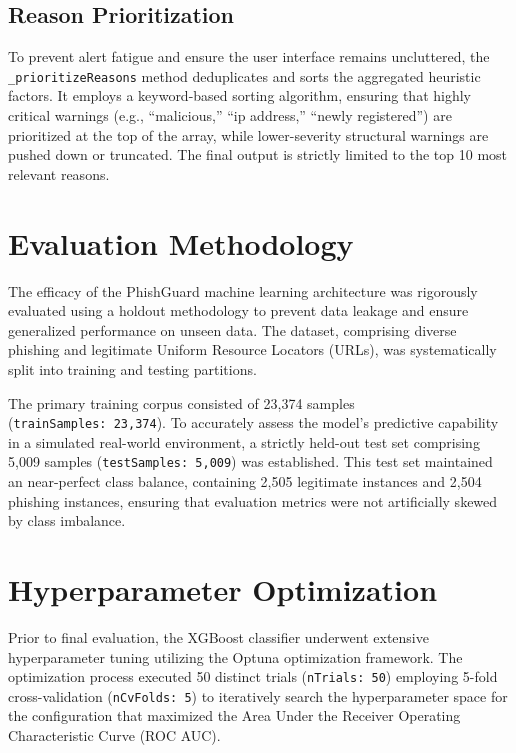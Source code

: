 \subsection{Reason Prioritization}\label{reason-prioritization}

To prevent alert fatigue and ensure the user interface remains
uncluttered, the \texttt{\_prioritizeReasons} method deduplicates and
sorts the aggregated heuristic factors. It employs a keyword-based
sorting algorithm, ensuring that highly critical warnings (e.g.,
``malicious,'' ``ip address,'' ``newly registered'') are prioritized at
the top of the array, while lower-severity structural warnings are
pushed down or truncated. The final output is strictly limited to the
top 10 most relevant reasons.



\section{Evaluation Methodology}\label{evaluation-methodology}

The efficacy of the PhishGuard machine learning architecture was
rigorously evaluated using a holdout methodology to prevent data leakage
and ensure generalized performance on unseen data. The dataset,
comprising diverse phishing and legitimate Uniform Resource Locators
(URLs), was systematically split into training and testing partitions.

The primary training corpus consisted of 23,374 samples
(\texttt{trainSamples:\ 23,374}). To accurately assess the model's
predictive capability in a simulated real-world environment, a strictly
held-out test set comprising 5,009 samples
(\texttt{testSamples:\ 5,009}) was established. This test set maintained
an near-perfect class balance, containing 2,505 legitimate instances and
2,504 phishing instances, ensuring that evaluation metrics were not
artificially skewed by class imbalance.

\section{Hyperparameter
Optimization}\label{hyperparameter-optimization}

Prior to final evaluation, the XGBoost classifier underwent extensive
hyperparameter tuning utilizing the Optuna optimization framework. The
optimization process executed 50 distinct trials (\texttt{nTrials:\ 50})
employing 5-fold cross-validation (\texttt{nCvFolds:\ 5}) to iteratively
search the hyperparameter space for the configuration that maximized the
Area Under the Receiver Operating Characteristic Curve (ROC AUC).

